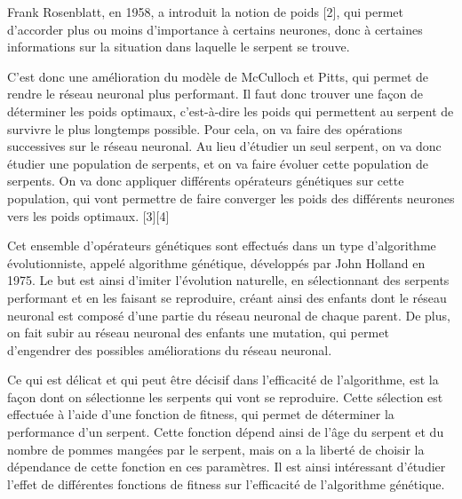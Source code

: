 \documentclass[11pt,a4paper]{article}
\begin{document}
Frank Rosenblatt, en 1958, a introduit la notion de poids [2], qui permet d'accorder plus ou moins d'importance à certains neurones, donc à certaines informations sur la situation dans laquelle le serpent se trouve.

C'est donc une amélioration du modèle de McCulloch et Pitts, qui permet de rendre le réseau neuronal plus performant.
Il faut donc trouver une façon de déterminer les poids optimaux, c'est-à-dire les poids qui permettent au serpent de survivre le plus longtemps possible.
Pour cela, on va faire des opérations successives sur le réseau neuronal.
Au lieu d'étudier un seul serpent, on va donc étudier une population de serpents, et on va faire évoluer cette population de serpents.
On va donc appliquer différents opérateurs génétiques sur cette population, qui vont permettre de faire converger les poids des différents neurones vers les poids optimaux. [3][4]




Cet ensemble d'opérateurs génétiques sont effectués dans un type d'algorithme évolutionniste, appelé algorithme génétique, développés par John Holland en 1975.
Le but est ainsi d'imiter l'évolution naturelle, en sélectionnant des serpents performant et en les faisant se reproduire, créant ainsi des enfants dont le réseau neuronal est composé d'une partie du réseau neuronal de chaque parent.
De plus, on fait subir au réseau neuronal des enfants une mutation, qui permet d'engendrer des possibles améliorations du réseau neuronal.

Ce qui est délicat et qui peut être décisif dans l'efficacité de l'algorithme, est la façon dont on sélectionne les serpents qui vont se reproduire.
Cette sélection est effectuée à l'aide d'une fonction de fitness, qui permet de déterminer la performance d'un serpent.
Cette fonction dépend ainsi de l'âge du serpent et du nombre de pommes mangées par le serpent, mais on a la liberté de choisir la dépendance de cette fonction en ces paramètres.
Il est ainsi intéressant d'étudier l'effet de différentes fonctions de fitness sur l'efficacité de l'algorithme génétique.
\end{document}
